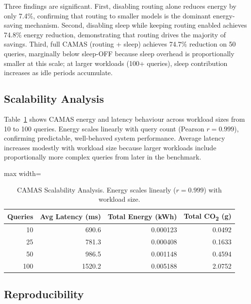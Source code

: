 \documentclass[journal]{IEEEtran}
\begin{document}
Three findings are significant. First, disabling routing alone reduces energy
by only 7.4\%, confirming that routing to smaller models is the dominant
energy-saving mechanism. Second, disabling sleep while keeping routing enabled
achieves 74.8\% energy reduction, demonstrating that routing drives the
majority of savings. Third, full CAMAS (routing + sleep) achieves 74.7\%
reduction on 50 queries, marginally below sleep-OFF because sleep overhead is
proportionally smaller at this scale; at larger workloads (100+ queries),
sleep contribution increases as idle periods accumulate.

\subsection{Scalability Analysis}

Table~\ref{tab:scalability} shows CAMAS energy and latency behaviour across
workload sizes from 10 to 100 queries. Energy scales linearly with query count
(Pearson $r = 0.999$), confirming predictable, well-behaved system
performance. Average latency increases modestly with workload size because
larger workloads include proportionally more complex queries from later in the
benchmark.

\begin{table}[!htbp]
\renewcommand{\arraystretch}{1.3}
\centering
\caption{CAMAS Scalability Analysis. Energy scales linearly ($r = 0.999$) with
workload size.}
\label{tab:scalability}
\begin{adjustbox}{max width=\linewidth}\begin{tabular}{@{}rrrr@{}}
\toprule
\textbf{Queries} & \textbf{Avg Latency (ms)} & \textbf{Total Energy (kWh)} & \textbf{Total CO\textsubscript{2} (g)} \\
\midrule
 10  &  690.6 & 0.000123 & 0.0492 \\
 25  &  781.3 & 0.000408 & 0.1633 \\
 50  &  986.5 & 0.001148 & 0.4594 \\
100  & 1520.2 & 0.005188 & 2.0752 \\
\bottomrule
\end{tabular}\end{adjustbox}
\end{table}

\subsection{Reproducibility}
\end{document}
